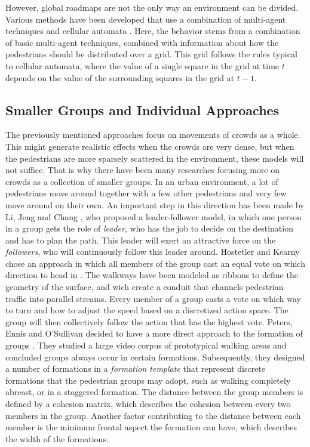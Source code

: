 \documentclass[11pt]{book}
\begin{document}
However, global roadmaps are not the only way an environment can be divided. Various methods have been developed that use a combination of multi-agent techniques and cellular automata \cite{Dijkstra00amulti-agent}\cite{1241047}. Here, the behavior stems from a combination of basic multi-agent techniques, combined with information about how the pedestrians should be distributed over a grid. This grid follows the rules typical to cellular automata, where the value of a single square in the grid at time $t$ depends on the value of the surrounding squares in the grid at $t-1$.


\subsection{Smaller Groups and Individual Approaches}
The previously mentioned approaches focus on movements of crowds as a whole. This might generate realistic effects when the crowds are very dense, but when the pedestrians are more sparsely scattered in the environment, these models will not suffice. That is why there have been many researches focusing more on crowds as a collection of smaller groups. In an urban environment, a lot of pedestrians move around together with a few other pedestrians and very few move around on their own. An important step in this direction has been made by Li, Jeng and Chang \cite{leaderfollower}, who proposed a leader-follower model, in which one person in a group gets the role of \emph{leader}, who has the job to decide on the destination and has to plan the path. This leader will exert an attractive force on the \emph{followers}, who will continuously follow this leader around. Hostetler and Kearny chose an approach in which all members of the group cast an equal vote on which direction to head in \cite{Hostetler02strollingdown}. The walkways have been modeled as ribbons to define the geometry of the surface, and wich create a conduit that channels pedestrian traffic into parallel streams. Every member of a group casts a vote on which way to turn and how to adjust the speed based on a discretized action space. The group will then collectively follow the action that has the highest vote. Peters, Ennis and O'Sullivan decided to have a more direct approach to the formation of groups \cite{10.1109MCG.2009.69}. They studied a large video corpus of prototypical walking areas and concluded groups always occur in certain formations. Subsequently, they designed a number of formations in a \emph{formation template} that represent discrete formations that the pedestrian groups may adopt, such as walking completely abreast, or in a staggered formation. The distance between the group members is defined by a cohesion matrix, which describes the cohesion between every two members in the group. Another factor contributing to the distance between each member is the minimum frontal aspect the formation can have, which describes the width of the formations.\\
\end{document}
